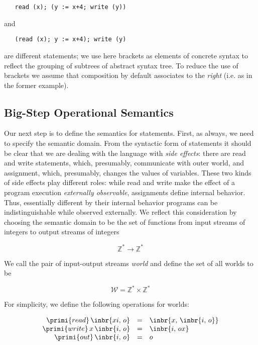 \begin{lstlisting}
   read (x); (y := x+4; write (y))
\end{lstlisting}

and

\begin{lstlisting}
   (read (x); y := x+4); write (y)
\end{lstlisting}

are different statements; we use here brackets as elements of concrete syntax to reflect the grouping of subtrees of abstract syntax tree.
To reduce the use of brackets we assume that composition by default associates to the \emph{right} (i.e. as in the former example).

\subsection{Big-Step Operational Semantics}

Our next step is to define the semantics for statements. First, as always, we need to specify the semantic domain.
From the syntactic form of statements it should be clear that we are dealing with the language with \emph{side effects}: there are read and write statements,
which, presumably, communicate with outer world, and assignment, which, presumably, changes the values of variables. These two kinds of side effects
play different roles: while read and write make the effect of a program execution \emph{externally observable}, assignments define internal behavior.
Thus, essentially different by their internal behavior programs can be indistinguishable while observed externally. We reflect this consideration by
choosing the semantic domain to be the set of functions from input streams of integers to output streams of integers

\[
\mathbb{Z}^*\to\mathbb{Z}^*
\]

We call the pair of input-output streams \emph{world} and define the set of all worlds to be

\[
  \mathscr W = \mathbb Z^* \times \mathbb Z^*
\]

For simplicity, we define the following operations for worlds:

\[
\begin{array}{rcl}
  \primi{read}\,{\inbr{xi,\,o}}    & = & \inbr{x,\,\inbr{i,\,o}}\\
  \primi{write}\,{x\,\inbr{i,\,o}} & = & \inbr{i,\,ox}\\
  \primi{out}\,{\inbr{i,\,o}}      & = & o
\end{array}
\]


